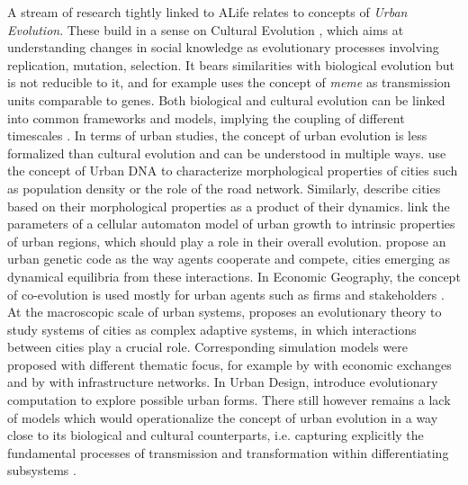 \documentclass[letterpaper]{article}
\begin{document}
A stream of research tightly linked to ALife relates to concepts of \emph{Urban Evolution}. These build in a sense on Cultural Evolution \citep{mesoudi2001cultural}, which aims at understanding changes in social knowledge as evolutionary processes involving replication, mutation, selection. It bears similarities with biological evolution but is not reducible to it, and for example uses the concept of \emph{meme} as transmission units comparable to genes. Both biological and cultural evolution can be linked into common frameworks and models, implying the coupling of different timescales \citep{bull2000meme}. In terms of urban studies, the concept of urban evolution is less formalized than cultural evolution and can be understood in multiple ways. \cite{votsis2019urban} use the concept of Urban DNA to characterize morphological properties of cities such as population density or the role of the road network. Similarly, \cite{kaya2017urban} describe cities based on their morphological properties as a product of their dynamics. \cite{wu2011urban} link the parameters of a cellular automaton model of urban growth to intrinsic properties of urban regions, which should play a role in their overall evolution. \cite{d2014urban} propose an urban genetic code as the way agents cooperate and compete, cities emerging as dynamical equilibria from these interactions. In Economic Geography, the concept of co-evolution is used mostly for urban agents such as firms and stakeholders \citep{gong2019co}. At the macroscopic scale of urban systems, \cite{pumain2018evolutionary} proposes an evolutionary theory to study systems of cities as complex adaptive systems, in which interactions between cities play a crucial role. Corresponding simulation models were proposed with different thematic focus, for example by \cite{cottineau2015modular} with economic exchanges and by \cite{raimbault2020indirect} with infrastructure networks. In Urban Design, \cite{batty2009digital} introduce evolutionary computation to explore possible urban forms. There still however remains a lack of models which would operationalize the concept of urban evolution in a way close to its biological and cultural counterparts, i.e. capturing explicitly the fundamental processes of transmission and transformation within differentiating subsystems \citep{durham1991coevolution}.


\end{document}
